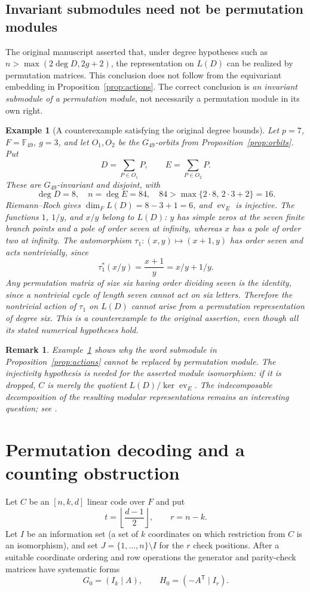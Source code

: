 \documentclass[12pt]{article}
\newtheorem{example}[theorem]{Example}
\newtheorem{remark}[theorem]{Remark}
\numberwithin{equation}{section}
\newcommand{\F}{\mathbb{F}}
\newcommand{\ev}{\operatorname{ev}}
\begin{document}
\subsection{Invariant submodules need not be permutation modules}
The original manuscript asserted that, under degree hypotheses
such as $n>\max(2\deg D,2g+2)$, the representation on $L(D)$
can be realized by permutation matrices.  This conclusion does
not follow from the equivariant embedding in
Proposition~\ref{prop:actions}.  The correct conclusion is
\emph{an invariant submodule of a permutation module}, not
necessarily a permutation module in its own right.

\begin{example}[A counterexample satisfying the original degree bounds]
\label{ex:not-permutation}
Let $p=7$, $F=\F_{49}$, $g=3$, and let $O_1,O_2$ be the
$G_{49}$-orbits from Proposition~\ref{prop:orbits}.  Put
\[
D=\sum_{P\in O_1}P,
\qquad E=\sum_{P\in O_2}P.
\]
These are $G_{49}$-invariant and disjoint, with
\[
\deg D=8,\quad n=\deg E=84,
\quad 84>\max\{2\cdot8,\,2\cdot3+2\}=16.
\]
Riemann--Roch gives
$\dim_F L(D)=8-3+1=6$, and $\ev_E$ is injective.
The functions $1$, $1/y$, and $x/y$ belong to $L(D)$:
$y$ has simple zeros at the seven finite branch points
and a pole of order seven at infinity, whereas $x$ has a
pole of order two at infinity.
The automorphism $\tau_1:(x,y)\mapsto(x+1,y)$ has order
seven and acts nontrivially, since
\[
\tau_1^*(x/y)=\frac{x+1}{y}=x/y+1/y.
\]
Any permutation matrix of size six having order dividing
seven is the identity, since a nontrivial cycle of length
seven cannot act on six letters.  Therefore the nontrivial
action of $\tau_1$ on $L(D)$ cannot arise from a permutation
representation of degree six.  This is a counterexample to
the original assertion, even though all its stated numerical
hypotheses hold.
\end{example}

\begin{remark}
Example~\ref{ex:not-permutation} shows why the word
\emph{submodule} in Proposition~\ref{prop:actions} cannot be
replaced by \emph{permutation module}.  The injectivity
hypothesis is needed for the asserted module isomorphism:
if it is dropped, $C$ is merely the quotient
$L(D)/\ker\ev_E$.  The indecomposable decomposition of the
resulting modular representations remains an interesting
question; see \cite{JK2,JT,S}.
\end{remark}

\section{Permutation decoding and a counting obstruction}
\label{sec:PD}
Let $C$ be an $[n,k,d]$ linear code over $F$ and put
\[
t=\left\lfloor\frac{d-1}{2}\right\rfloor,
\qquad r=n-k.
\]
Let $I$ be an information set (a set of $k$ coordinates on
which restriction from $C$ is an isomorphism), and set
$J=\{1,\dots,n\}\setminus I$ for the $r$ check positions.
After a suitable coordinate ordering and row operations the
generator and parity-check matrices have systematic forms
\[
G_0=(I_k\mid A),\qquad H_0=(-A^{\mathsf T}\mid I_r).
\]
\end{document}
